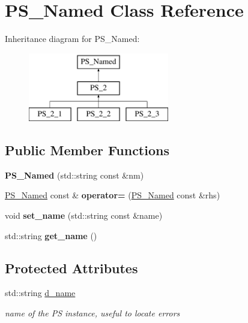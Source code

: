 \hypertarget{classPS__Named}{}\section{P\+S\+\_\+\+Named Class Reference}
\label{classPS__Named}
Inheritance diagram for P\+S\+\_\+\+Named\+:\begin{figure}[H]
\begin{center}
\leavevmode
\includegraphics[height=3.000000cm]{classPS__Named}
\end{center}
\end{figure}
\subsection*{Public Member Functions}
\begin{DoxyCompactItemize}
\item 
\hypertarget{classPS__Named_ae9995f08b542e78ca1a9dc96805ebfdf}{}{\bfseries P\+S\+\_\+\+Named} (std\+::string const \&nm)\label{classPS__Named_ae9995f08b542e78ca1a9dc96805ebfdf}

\item 
\hypertarget{classPS__Named_a49250b5b43dce6fc026241d023d0e155}{}\hyperlink{classPS__Named}{P\+S\+\_\+\+Named} const \& {\bfseries operator=} (\hyperlink{classPS__Named}{P\+S\+\_\+\+Named} const \&rhs)\label{classPS__Named_a49250b5b43dce6fc026241d023d0e155}

\item 
\hypertarget{classPS__Named_ae072e1468a73ca31410d4cce3be6a6e9}{}void {\bfseries set\+\_\+name} (std\+::string const \&name)\label{classPS__Named_ae072e1468a73ca31410d4cce3be6a6e9}

\item 
\hypertarget{classPS__Named_a5b6f04214d47c462f7bc65c4ed5e867f}{}std\+::string {\bfseries get\+\_\+name} ()\label{classPS__Named_a5b6f04214d47c462f7bc65c4ed5e867f}

\end{DoxyCompactItemize}
\subsection*{Protected Attributes}
\begin{DoxyCompactItemize}
\item 
\hypertarget{classPS__Named_a4c24a47ba31313b51c2eed75fa441a4a}{}std\+::string \hyperlink{classPS__Named_a4c24a47ba31313b51c2eed75fa441a4a}{d\+\_\+name}\label{classPS__Named_a4c24a47ba31313b51c2eed75fa441a4a}

\begin{DoxyCompactList}\small\item\em name of the P\+S instance, useful to locate errors \end{DoxyCompactList}\end{DoxyCompactItemize}


